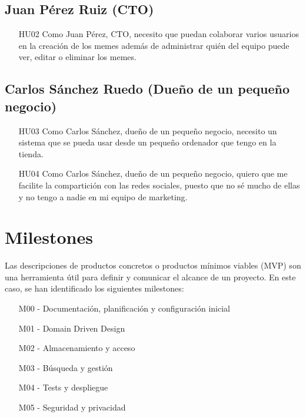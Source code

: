     \subsection{Juan Pérez Ruiz (CTO)}

        \begin{enumerate}
            \item [HU02] Como Juan Pérez, CTO, necesito que puedan colaborar varios usuarios en la creación de los memes además de administrar quién del equipo puede ver, editar o eliminar los memes.
        \end{enumerate}

    \subsection{Carlos Sánchez Ruedo (Dueño de un pequeño negocio)}

        \begin{enumerate}
            \item [HU03] Como Carlos Sánchez, dueño de un pequeño negocio, necesito un sistema que se pueda usar desde un pequeño ordenador que tengo en la tienda.
            \item [HU04] Como Carlos Sánchez, dueño de un pequeño negocio, quiero que me facilite la compartición con las redes sociales, puesto que no sé mucho de ellas y no tengo a nadie en mi equipo de marketing. 
        \end{enumerate}

\section{Milestones}

Las descripciones de productos concretos o productos mínimos viables (MVP) son una herramienta útil para definir y comunicar el alcance de un proyecto. En este caso, se han identificado los siguientes milestones:

\begin{enumerate}
    \item [M00] - Documentación, planificación y configuración inicial
    \item [M01] - Domain Driven Design
    \item [M02] - Almacenamiento y acceso
    \item [M03] - Búsqueda y gestión
    \item [M04] - Tests y despliegue
    \item [M05] - Seguridad y privacidad
\end{enumerate}